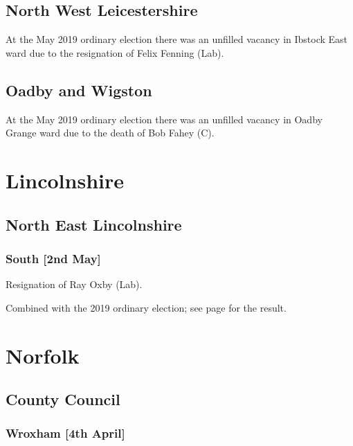\documentclass[a4paper,openany]{book}
\begin{document}
\begin{resultsiii}
\subsection*{North West Leicestershire}

At the May 2019 ordinary election there was an unfilled vacancy in Ibstock East ward due to the resignation of Felix Fenning (Lab).

\subsection*{Oadby and Wigston}

At the May 2019 ordinary election there was an unfilled vacancy in Oadby Grange ward due to the death of Bob Fahey (C).

\section{Lincolnshire}

\subsection*{North East Lincolnshire}

\subsubsection*{South \hspace*{\fill}\nolinebreak[1]%
	\enspace\hspace*{\fill}
	[2nd May]}


Resignation of Ray Oxby (Lab).

Combined with the 2019 ordinary election; see page \pageref{NorthEastLincolnshireSouth} for the result.

\section{Norfolk}

\subsection*{County Council}

\subsubsection*{Wroxham \hspace*{\fill}\nolinebreak[1]%
	\enspace\hspace*{\fill}
	[4th April]}


\end{resultsiii}
\end{document}
